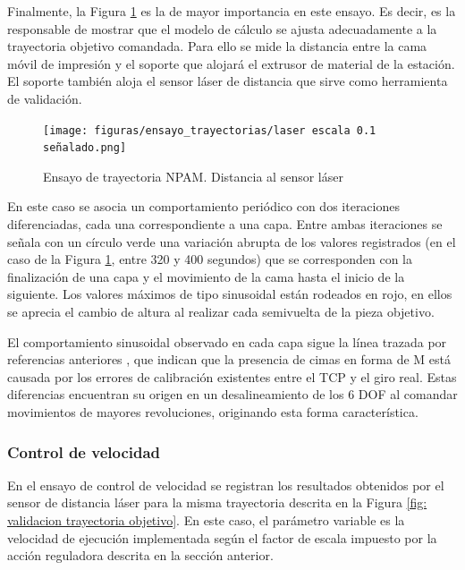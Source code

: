 Finalmente, la Figura \ref{fig: laser ensayo trayectoria NPAM} es la de mayor importancia en este ensayo. Es decir, es la responsable de mostrar que el modelo de cálculo se ajusta adecuadamente a la trayectoria objetivo comandada. Para ello se mide la distancia entre la cama móvil de impresión y el soporte que alojará el extrusor de material de la estación. El soporte también aloja el sensor láser de distancia que sirve como herramienta de validación. 

\begin{figure}[H]
    \centering
    \texttt{[image: figuras/ensayo\_trayectorias/laser escala 0.1 señalado.png]}
    \caption{Ensayo de trayectoria \acrshort{NPAM}. Distancia al sensor láser}
    \label{fig: laser ensayo trayectoria NPAM}
\end{figure}

En este caso se asocia un comportamiento periódico con dos iteraciones diferenciadas, cada una correspondiente a una capa. Entre ambas iteraciones se señala con un círculo verde una variación abrupta de los valores registrados (en el caso de la Figura \ref{fig: laser ensayo trayectoria NPAM}, entre 320 y 400 segundos) que se corresponden con la finalización de una capa y el movimiento de la cama hasta el inicio de la siguiente. Los valores máximos de tipo sinusoidal están rodeados en rojo, en ellos se aprecia el cambio de altura al realizar cada semivuelta de la pieza objetivo. 

El comportamiento sinusoidal observado en cada capa sigue la línea trazada por referencias anteriores \cite{paper_Q1_Alvaro_Adrian}\cite{TFM_SanchoAmparo}, que indican que la presencia de cimas en forma de M está causada por los errores de calibración existentes entre el \acrshort{TCP} y el giro real. Estas diferencias encuentran su origen en un desalineamiento de los 6 \acrshort{DOF} al comandar movimientos de mayores revoluciones,  originando esta forma característica.

\subsubsection*{Control de velocidad}
\hypertarget{Control de velocidad ensayo}{}
\label{sec: control velocidad ensayo}

En el ensayo de control de velocidad se registran los resultados obtenidos por el sensor de distancia láser para la misma trayectoria descrita en la Figura \ref{fig: validacion trayectoria objetivo}. En este caso, el parámetro variable es la velocidad de ejecución implementada según el factor de escala impuesto por la acción reguladora descrita en la sección anterior. 

